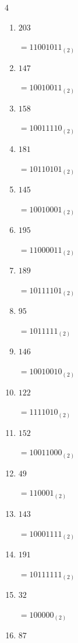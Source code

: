\begin{multicols}{4}
\begin{enumerate}
        $=10110110_{(2)}$

  \item $203$

        $=11001011_{(2)}$

  \item $147$

        $=10010011_{(2)}$

  \item $158$

        $=10011110_{(2)}$

  \item $181$

        $=10110101_{(2)}$

  \item $145$

        $=10010001_{(2)}$

  \item $195$

        $=11000011_{(2)}$

  \item $189$

        $=10111101_{(2)}$

  \item $95$

        $=1011111_{(2)}$

  \item $146$

        $=10010010_{(2)}$

  \item $122$

        $=1111010_{(2)}$

  \item $152$

        $=10011000_{(2)}$

  \item $49$

        $=110001_{(2)}$

  \item $143$

        $=10001111_{(2)}$

  \item $191$

        $=10111111_{(2)}$

\columnbreak %

  \item $32$

        $=100000_{(2)}$

  \item $87$


\end{enumerate}
\end{multicols}
